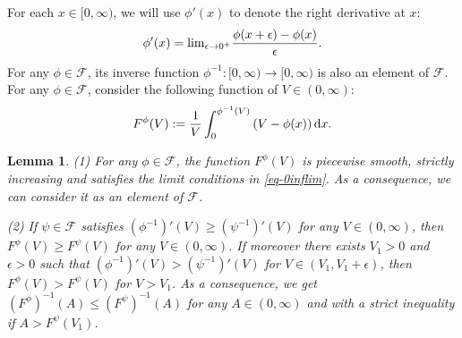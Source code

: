 \documentclass[12pt]{amsart}
\newtheorem{lem}[thm]{Lemma}
\theoremstyle{definition}
\def\lim{{\rm lim}}
\def\dif{{\rm d}}
\begin{document}
For each $x\in [0, \infty)$, we will use $\phi'(x)$ to denote the right derivative at $x$:
\begin{equation*} \phi'(x)=\lim_{\epsilon\rightarrow 0^+}
\frac{\phi(x+\epsilon)-\phi(x)}{\epsilon}. 
\end{equation*}
For any $\phi\in \mathscr{F}$, its inverse function $\phi^{-1}: [0, \infty)\rightarrow [0, \infty)$ is also an element of $\mathscr{F}$.  
For any $\phi\in \mathscr{F}$, consider the following function of $V\in (0, \infty)$:
 \begin{equation*}
       F^{\phi}(V):= 
       \frac{1}{V}\int_0^{\phi^{-1}(V)}\left(V-\phi(x)\right)\dif x. %
    \end{equation*} 
\begin{lem}  \label{lem-cal}
(1) For any $\phi\in \mathscr{F}$, the function $F^\phi(V)$ is piecewise smooth, strictly increasing and satisfies the limit conditions in \eqref{eq-0inflim}. As a consequence, we can consider it as an element of $\mathscr{F}$. 

(2) If $\psi\in \mathscr{F}$ satisfies $(\phi^{-1})'(V)\ge (\psi^{-1})'(V)$ for any $V\in (0, \infty)$, then $F^{\phi}(V)\ge F^{\psi}(V)$ for any $V\in (0, \infty)$. If moreover there exists $V_1>0$ and $\epsilon>0$ such that $(\phi^{-1})'(V)>(\psi^{-1})'(V)$ for $V\in (V_1, V_1+\epsilon)$, then $F^\phi(V)>F^{\psi}(V)$ for $V> V_1$. As a consequence, we get $(F^{\phi})^{-1}(A)\le (F^{\psi})^{-1}(A)$ for any $A\in (0, \infty)$ and with a strict inequality if $A>F^\psi(V_1)$. 
\end{lem}
\end{document}
